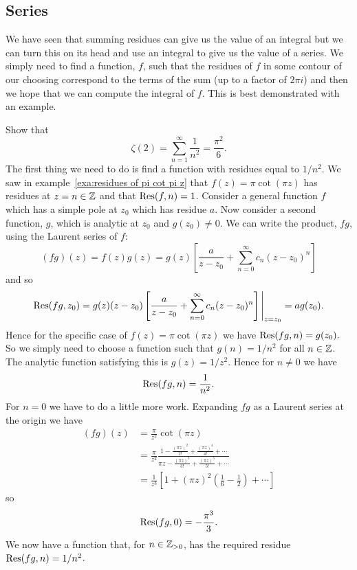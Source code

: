 \documentclass{article}
\begin{document}
    \subsection{Series}
    We have seen that summing residues can give us the value of an integral but we can turn this on its head and use an integral to give us the value of a series.
    We simply need to find a function, \(f\), such that the residues of \(f\) in some contour of our choosing correspond to the terms of the sum (up to a factor of \(2\pi i\)) and then we hope that we can compute the integral of \(f\).
    This is best demonstrated with an example.
    
    Show that
    \[\zeta(2) = \sum_{n=1}^{\infty} \frac{1}{n^2} = \frac{\pi^{2}}{6}.\]
    The first thing we need to do is find a function with residues equal to \(1/n^2\).
    We saw in example~\ref{exa:residues of pi cot pi z} that \(f(z) = \pi\cot(\pi z)\) has residues at \(z = n \in\mathbb{Z}\) and that \(\Res(f, n) = 1\).
    Consider a general function \(f\) which has a simple pole at \(z_0\) which has residue \(a\).
    Now consider a second function, \(g\), which is analytic at \(z_0\) and \(g(z_0) \ne 0\).
    We can write the product, \(fg\), using the Laurent series of \(f\):
    \[(fg)(z) = f(z)g(z) = g(z)\left[ \frac{a}{z - z_0} + \sum_{n=0}^{\infty} c_n(z - z_0)^n \right]\]
    and so
    \[\Res(fg, z_0) = g(z)(z - z_0)\left[ \frac{a}{z - z_0} + \sum_{n=0}^{\infty} c_n(z - z_0)^n \right] \Bigg|_{z = z_0} = ag(z_0). \]
    Hence for the specific case of \(f(z) = \pi\cot(\pi z)\) we have \(\Res(fg, n) = g(z_0).\)
    So we simply need to choose a function such that \(g(n) = 1/n^2\) for all \(n\in\mathbb{Z}\).
    The analytic function satisfying this is \(g(z) = 1/z^2\).
    Hence for \(n \ne 0\) we have
    \[\Res(fg, n) = \frac{1}{n^2}.\]
    For \(n = 0\) we have to do a little more work.
    Expanding \(fg\) as a Laurent series at the origin we have
    \begin{align*}
        (fg)(z) &= \frac{\pi}{z^2}\cot(\pi z)\\
        &= \frac{\pi}{z^2} \frac{1 - \frac{(\pi z)^2}{2!} + \frac{(\pi z)^4}{4!} + \dotsb}{\pi z - \frac{(\pi z)^3}{3!} + \frac{(\pi z)^5}{5!} + \dotsb}\\
        &= \frac{1}{z^3} \left[ 1 + (\pi z)^2\left( \frac{1}{6} - \frac{1}{2} \right) + \dotsb \right]
    \end{align*}
    so
    \[\Res(fg, 0) = -\frac{\pi^3}{3}.\]
    We now have a function that, for \(n\in\mathbb{Z}_{>0}\), has the required residue \(\Res(fg, n) = 1/n^2\).
\end{document}
